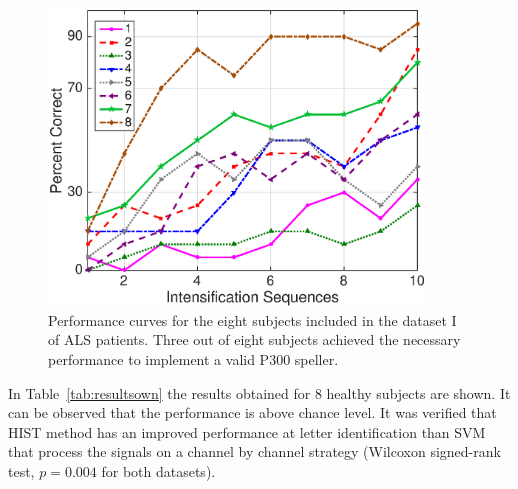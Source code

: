 \begin{figure}[h!]
\centering
\includegraphics[width=10cm]{images/performance.eps}
\caption[Dataset I ALS Patients Dataset P300 Performance Curves]{Performance curves for the eight subjects included in the dataset I of ALS patients.  Three out of eight subjects achieved the necessary performance to implement a valid P300 speller.}
\label{fig:performance}
\end{figure}




In Table~\ref{tab:resultsown} the results obtained for 8 healthy subjects are shown.  It can be observed that the performance is above chance level. It was verified that HIST method has an improved performance at letter identification than SVM that process the signals on a channel by channel strategy (Wilcoxon signed-rank test, $p =  0.004$ for both datasets).


